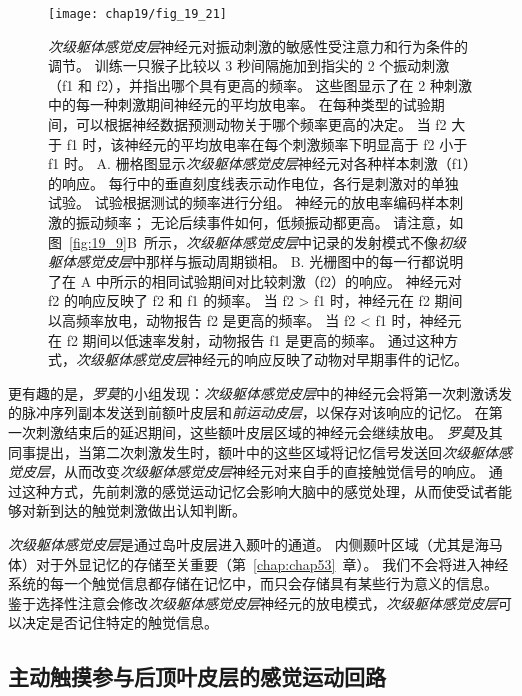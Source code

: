 \begin{figure}[htbp]
	\centering
	\texttt{[image: chap19/fig\_19\_21]}
	\caption{\textit{次级躯体感觉皮层}神经元对振动刺激的敏感性受注意力和行为条件的调节。
		训练一只猴子比较以 3 秒间隔施加到指尖的 2 个振动刺激（f1 和 f2），并指出哪个具有更高的频率。
		这些图显示了在 2 种刺激中的每一种刺激期间神经元的平均放电率。
		在每种类型的试验期间，可以根据神经数据预测动物关于哪个频率更高的决定。
		当 f2 大于 f1 时，该神经元的平均放电率在每个刺激频率下明显高于 f2 小于 f1 时\cite{romo2002neuronal}。
		A. 栅格图显示\textit{次级躯体感觉皮层}神经元对各种样本刺激（f1）的响应。
		每行中的垂直刻度线表示动作电位，各行是刺激对的单独试验。
		试验根据测试的频率进行分组。
		神经元的放电率编码样本刺激的振动频率； 无论后续事件如何，低频振动都更高。
		请注意，如图~\ref{fig:19_9}B~所示，\textit{次级躯体感觉皮层}中记录的发射模式不像\textit{初级躯体感觉皮层}中那样与振动周期锁相。
		B. 光栅图中的每一行都说明了在 A 中所示的相同试验期间对比较刺激（f2）的响应。
		神经元对 f2 的响应反映了 f2 和 f1 的频率。
		当 f2 > f1 时，神经元在 f2 期间以高频率放电，动物报告 f2 是更高的频率。
		当 f2 < f1 时，神经元在 f2 期间以低速率发射，动物报告 f1 是更高的频率。
		通过这种方式，\textit{次级躯体感觉皮层}神经元的响应反映了动物对早期事件的记忆。}
	\label{fig:19_21}
\end{figure}


更有趣的是，\textit{罗莫}的小组发现：\textit{次级躯体感觉皮层}中的神经元会将第一次刺激诱发的脉冲序列副本发送到前额叶皮层和\textit{前运动皮层}，以保存对该响应的记忆。
在第一次刺激结束后的延迟期间，这些额叶皮层区域的神经元会继续放电。
\textit{罗莫}及其同事提出，当第二次刺激发生时，额叶中的这些区域将记忆信号发送回\textit{次级躯体感觉皮层}，从而改变\textit{次级躯体感觉皮层}神经元对来自手的直接触觉信号的响应。
通过这种方式，先前刺激的感觉运动记忆会影响大脑中的感觉处理，从而使受试者能够对新到达的触觉刺激做出认知判断。


\textit{次级躯体感觉皮层}是通过岛叶皮层进入颞叶的通道。
内侧颞叶区域（尤其是海马体）对于外显记忆的存储至关重要（第~\ref{chap:chap53}~章）。
我们不会将进入神经系统的每一个触觉信息都存储在记忆中，而只会存储具有某些行为意义的信息。
鉴于选择性注意会修改\textit{次级躯体感觉皮层}神经元的放电模式，\textit{次级躯体感觉皮层}可以决定是否记住特定的触觉信息。



\subsection{主动触摸参与后顶叶皮层的感觉运动回路}

